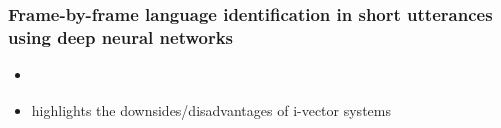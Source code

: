     \subsubsection{Frame-by-frame language identification in short utterances using deep neural networks}
    \begin{itemize}
        \item \cite{gonzalez2015frame}
        \item highlights the downsides/disadvantages of i-vector systems
        
    \end{itemize}
    
    
  
    